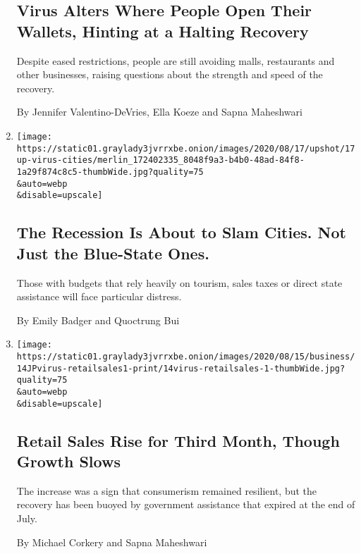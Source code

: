\begin{enumerate}
  \hypertarget{virus-alters-where-people-open-their-wallets-hinting-at-a-halting-recovery}{%
  \subsection{Virus Alters Where People Open Their Wallets, Hinting at a
  Halting
  Recovery}\label{virus-alters-where-people-open-their-wallets-hinting-at-a-halting-recovery}}

  Despite eased restrictions, people are still avoiding malls,
  restaurants and other businesses, raising questions about the strength
  and speed of the recovery.

  By Jennifer Valentino-DeVries, Ella Koeze and Sapna Maheshwari
\item
  \href{/2020/08/17/upshot/pandemic-recession-cities-fiscal-shortfall.html}{}

  \texttt{[image: https://static01.graylady3jvrrxbe.onion/images/2020/08/17/upshot/17up-virus-cities/merlin\_172402335\_8048f9a3-b4b0-48ad-84f8-1a29f874c8c5-thumbWide.jpg?quality=75\\\&auto=webp\\\&disable=upscale]}

  \hypertarget{the-recession-is-about-to-slam-cities-not-just-the-blue-state-ones}{%
  \subsection{The Recession Is About to Slam Cities. Not Just the
  Blue-State
  Ones.}\label{the-recession-is-about-to-slam-cities-not-just-the-blue-state-ones}}

  Those with budgets that rely heavily on tourism, sales taxes or direct
  state assistance will face particular distress.

  By Emily Badger and Quoctrung Bui
\item
  \href{/2020/08/14/business/retail-sales-coronavirus.html}{}

  \texttt{[image: https://static01.graylady3jvrrxbe.onion/images/2020/08/15/business/14JPvirus-retailsales1-print/14virus-retailsales-1-thumbWide.jpg?quality=75\\\&auto=webp\\\&disable=upscale]}

  \hypertarget{retail-sales-rise-for-third-month-though-growth-slows}{%
  \subsection{Retail Sales Rise for Third Month, Though Growth
  Slows}\label{retail-sales-rise-for-third-month-though-growth-slows}}

  The increase was a sign that consumerism remained resilient, but the
  recovery has been buoyed by government assistance that expired at the
  end of July.

  By Michael Corkery and Sapna Maheshwari
\end{enumerate}

